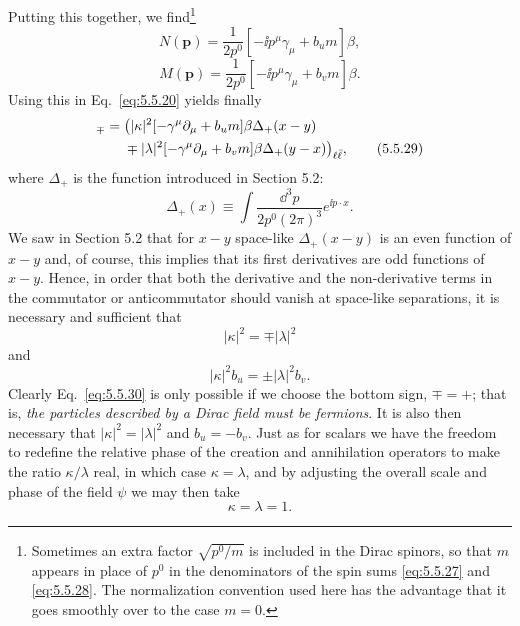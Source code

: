 Putting this together, we find\footnote{Sometimes an extra factor
$\sqrt{p^0/m}$ is included in the Dirac spinors, so that $m$ appears in place
of $p^0$ in the denominators of the spin sums \eqref{eq:5.5.27} and \eqref{eq:5.5.28}. The
normalization convention used here has the advantage that it goes smoothly
over to the case $m=0$.}
\begin{equation}
N(\mathbf p)=\frac1{2p^0}[-\ii p^\mu\gamma_\mu+b_um]\beta,
\tag{5.5.27}\label{eq:5.5.27}
\end{equation}
\begin{equation}
M(\mathbf p)=\frac1{2p^0}[-\ii p^\mu\gamma_\mu+b_vm]\beta.
\tag{5.5.28}\label{eq:5.5.28}
\end{equation}
Using this in Eq.~\eqref{eq:5.5.20} yields finally
\begin{align}
[\psi_\ell(x),\psi_{\bar\ell}^\dagger(y)]_\mp
={}&\bigl(|\kappa|^2[-\gamma^\mu\partial_\mu+b_um]\beta\Delta_+(x-y)
\notag\\
&\mp|\lambda|^2[-\gamma^\mu\partial_\mu+b_vm]\beta\Delta_+(y-x)\bigr)_{\ell\bar\ell},
\tag{5.5.29}\label{eq:5.5.29}
\end{align}
where $\Delta_+$ is the function introduced in Section 5.2:
\[
\Delta_+(x)\equiv\int\frac{\dd^3p}{2p^0(2\pi)^3}e^{\ii p\cdot x}.
\]
We saw in Section 5.2 that for $x-y$ space-like $\Delta_+(x-y)$ is an even
function of $x-y$ and, of course, this implies that its first derivatives are
odd functions of $x-y$. Hence, in order that both the derivative and the
non-derivative terms in the commutator or anticommutator should vanish at
space-like separations, it is necessary and sufficient that
\begin{equation}
|\kappa|^2=\mp|\lambda|^2
\tag{5.5.30}\label{eq:5.5.30}
\end{equation}
and
\begin{equation}
|\kappa|^2b_u=\pm|\lambda|^2b_v.
\tag{5.5.31}\label{eq:5.5.31}
\end{equation}
Clearly Eq.~\eqref{eq:5.5.30} is only possible if we choose the bottom sign,
$\mp=+$; that is, \emph{the particles described by a Dirac field must be
fermions}. It is also then necessary that $|\kappa|^2=|\lambda|^2$ and
$b_u=-b_v$. Just as for scalars we have the freedom to redefine the relative
phase of the creation and annihilation operators to make the ratio
$\kappa/\lambda$ real, in which case $\kappa=\lambda$, and by adjusting the
overall scale and phase of the field $\psi$ we may then take
\begin{equation}
\kappa=\lambda=1.
\tag{5.5.32}\label{eq:5.5.32}
\end{equation}
